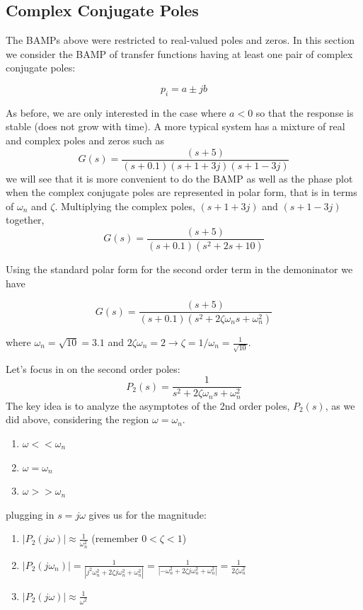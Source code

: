 \subsection{Complex Conjugate Poles}

The BAMPs above were restricted to real-valued poles and zeros.  In this section we consider the BAMP of transfer functions having at least one pair of complex conjugate poles:

\[
p_i = a \pm jb
\]

As before, we are only interested in the case where $a<0$ so that the response is stable (does not grow with time).  A more typical system has a mixture of real and complex poles and zeros such as
\[
G(s) =  \frac {(s+5)} {(s+0.1)(s+1+3j)(s+1-3j)}
\]
we will see that it is more convenient to do the BAMP as well as the phase plot when the complex conjugate poles are represented in polar form, that is in terms of $\omega_n$ and $\zeta$.  Multiplying the complex poles,
$(s+1+3j)$ and $(s+1-3j)$ together,
\[
G(s) = \frac  {(s+5)}  {(s+0.1) (s^2 + 2s + 10 )  }
\]

Using the standard polar form for the second order term in the demoninator we have

\[
G(s) = \frac  {(s+5)}  {(s+0.1) (s^2 + 2\zeta\omega_n s + \omega_n^2)}
\]

where $\omega_n = \sqrt{10} = 3.1$ and $2\zeta\omega_n = 2 \to \zeta = 1/\omega_n = \frac{1}{\sqrt{10}} $.

Let's focus in on the second order poles:
\[
P_2(s) =   \frac {1}{s^2 + 2\zeta\omega_n s + \omega_n^2 }
\]
The key idea is to analyze the asymptotes of the 2nd order poles, $P_2(s)$, as we did above,  considering the region $\omega = \omega_n$.

\begin{enumerate}
  \item $\omega << \omega_n$
  \item $\omega =  \omega_n$
  \item $\omega >> \omega_n$
\end{enumerate}

plugging in $s=j\omega$  gives us for the magnitude:

\begin{enumerate}
  \item $|P_2(j\omega)| \approx \frac {1}{\omega_n^2}$ (remember $0< \zeta < 1$)
  \item $|P_2(j\omega_n)| = \frac  {1}{|j^2\omega_n^2 + 2\zeta j \omega_n^2 + \omega_n^2|}  =
                               \frac{1}{|-\omega_n^2 + 2\zeta j \omega_n^2 + \omega_n^2|} =
                               \frac{1}{2\zeta \omega_n^2}$
  \item $|P_2(j\omega)| \approx \frac {1}{\omega^2}$
\end{enumerate}

